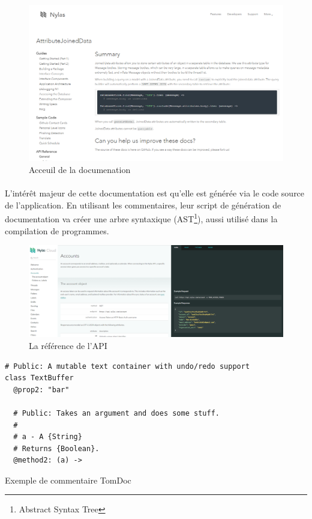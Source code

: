         \begin{figure}[ht]
            \centering
            \includegraphics[scale=0.35]{./assets/nylasdoc2.png}
            \caption{Acceuil de la documenation}
        \end{figure}

        \paragraph{}
            L'intérêt majeur de cette documentation est qu'elle est générée via le code source de l'application.
            En utilisant les commentaires, leur script de génération de documentation va créer une arbre syntaxique (AST\footnote{Abstract Syntax Tree}),
            aussi utilisé dans la compilation de programmes.

        \begin{figure}[h]
            \centering
            \includegraphics[width=\textwidth]{./assets/nylasdoc.png}
            \caption{La référence de l'API}
        \end{figure}

        \begin{listing}[ht]
            \begin{verbatim}
# Public: A mutable text container with undo/redo support
class TextBuffer
  @prop2: "bar"

  # Public: Takes an argument and does some stuff.
  #
  # a - A {String}
  # Returns {Boolean}.
  @method2: (a) ->
            \end{verbatim}
            \caption{Exemple de commentaire TomDoc}
        \end{listing}

